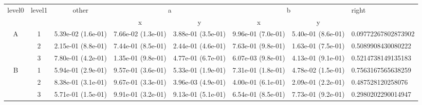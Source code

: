 \begin{tabular}{cccccccl}
\toprule
\multirow{2}{*}{level0} & \multirow{2}{*}{level1}& \multirow{2}{*}{other}&\multicolumn{2}{c}{a}&\multicolumn{2}{c}{b}& \multirow{2}{*}{right}\tabularnewline
\cmidrule(lr){4-5}
\cmidrule(lr){6-7}
&&&x&y&x&y\tabularnewline
\midrule
\multirow{3}{*}{A}&1& 5.39e-02 (1.6e-01)& 7.66e-02 (1.3e-01)& 3.88e-01 (3.5e-01)& 9.96e-01 (7.0e-01)& 5.40e-01 (8.6e-01)& 0.09772267802873902\tabularnewline
&2& 2.15e-01 (8.8e-01)& 7.44e-01 (8.5e-01)& 2.44e-01 (4.6e-01)& 7.63e-01 (9.8e-01)& 1.63e-01 (7.5e-01)& 0.5089908430080222\tabularnewline
&3& 7.80e-01 (4.2e-01)& 1.35e-01 (9.8e-01)& 4.77e-01 (6.7e-01)& 6.07e-03 (9.8e-01)& 4.13e-01 (9.1e-01)& 0.5214738149135183\tabularnewline
\midrule
\multirow{3}{*}{B}&1& 5.94e-01 (2.9e-01)& 9.57e-01 (3.6e-01)& 5.33e-01 (1.9e-01)& 7.31e-01 (1.8e-01)& 4.78e-02 (1.5e-01)& 0.7563167565638259\tabularnewline
&2& 8.38e-01 (3.1e-01)& 9.67e-01 (3.3e-01)& 3.96e-03 (4.9e-01)& 4.00e-01 (6.1e-01)& 2.09e-01 (2.2e-01)& 0.487528120258076\tabularnewline
&3& 5.71e-01 (1.5e-01)& 9.91e-01 (3.2e-01)& 9.13e-01 (5.1e-01)& 6.54e-01 (8.5e-01)& 7.73e-01 (9.2e-01)& 0.2980202290014947\tabularnewline
\bottomrule
\end{tabular}
